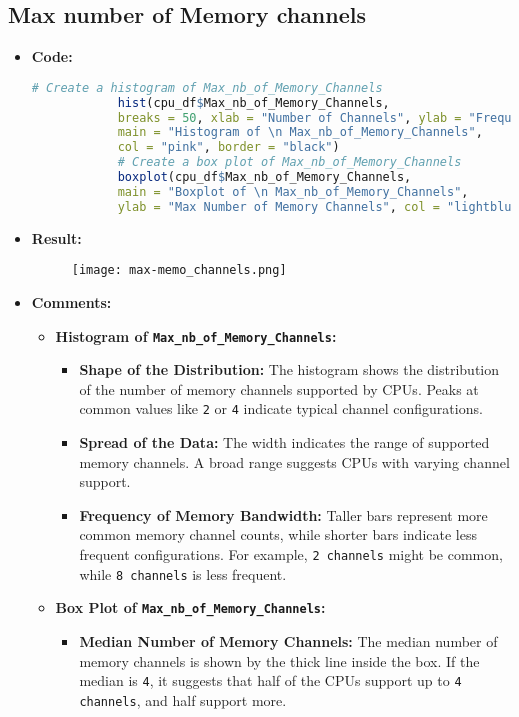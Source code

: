 \documentclass{article}
\begin{document}
	\subsection{Max number of Memory channels}
	\begin{itemize}
		\item \textbf{Code:}
		\begin{lstlisting}[basicstyle=\ttfamily, frame=single,language=R]
			# Create a histogram of Max_nb_of_Memory_Channels
			hist(cpu_df$Max_nb_of_Memory_Channels, 
			breaks = 50, xlab = "Number of Channels", ylab = "Frequency", 
			main = "Histogram of \n Max_nb_of_Memory_Channels", 
			col = "pink", border = "black")
			# Create a box plot of Max_nb_of_Memory_Channels
			boxplot(cpu_df$Max_nb_of_Memory_Channels, 
			main = "Boxplot of \n Max_nb_of_Memory_Channels", 
			ylab = "Max Number of Memory Channels", col = "lightblue", border = "black")
		\end{lstlisting}
		\item \textbf{Result:}
		\begin{figure}[h]
			\centering
			\texttt{[image: max-memo\_channels.png]}  %
			\label{fig:enter-label}
		\end{figure}
		\item \textbf{Comments:}
		\begin{itemize}
			\item \textbf{Histogram of \texttt{Max\_nb\_of\_Memory\_Channels}:}
			\begin{itemize}
				\item \textbf{Shape of the Distribution:} The histogram shows the distribution of the number of memory channels supported by CPUs. Peaks at common values like \texttt{2} or \texttt{4} indicate typical channel configurations.
				\item \textbf{Spread of the Data:} The width indicates the range of supported memory channels. A broad range suggests CPUs with varying channel support.
				\item \textbf{Frequency of Memory Bandwidth:} Taller bars represent more common memory channel counts, while shorter bars indicate less frequent configurations. For example, \texttt{2 channels} might be common, while \texttt{8 channels} is less frequent.
			\end{itemize}
			\item \textbf{Box Plot of \texttt{Max\_nb\_of\_Memory\_Channels}:}
			\begin{itemize}
				\item \textbf{Median Number of Memory Channels:} The median number of memory channels is shown by the thick line inside the box. If the median is \texttt{4}, it suggests that half of the CPUs support up to \texttt{4 channels}, and half support more.

\end{itemize}
\end{itemize}
\end{itemize}
\end{document}
